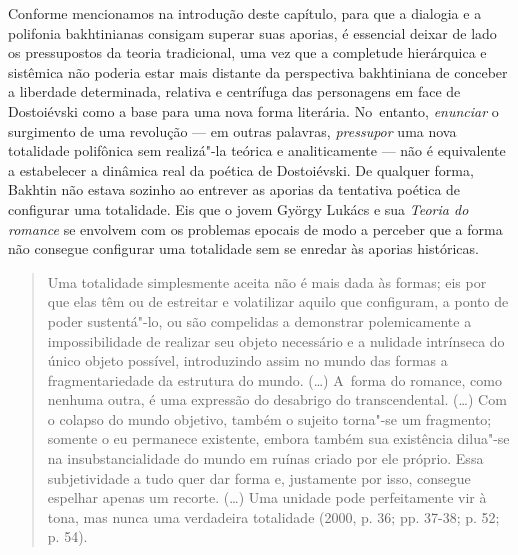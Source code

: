 Conforme mencionamos na introdução deste capítulo, para que a dialogia e
a polifonia bakhtinianas consigam superar suas aporias, é essencial
deixar de lado os pressupostos da teoria tradicional, uma vez que a
completude hierárquica e sistêmica não poderia estar mais distante da
perspectiva bakhtiniana de conceber a liberdade determinada, relativa e
centrífuga das personagens em face de Dostoiévski como a base para uma
nova forma literária. No~entanto, \emph{enunciar} o surgimento de uma
revolução --- em outras palavras, \emph{pressupor} uma nova totalidade
polifônica sem realizá"-la teórica e analiticamente --- não é equivalente
a estabelecer a dinâmica real da poética de Dostoiévski. De qualquer
forma, Bakhtin não estava sozinho ao entrever as aporias da tentativa
poética de configurar uma totalidade. Eis que o jovem György Lukács e
sua \emph{Teoria do romance} se envolvem com os problemas epocais de
modo a perceber que a forma não consegue configurar uma totalidade sem
se enredar às aporias históricas.

\begin{quote}
Uma totalidade simplesmente aceita não é mais dada às formas; eis por
que elas têm ou de estreitar e volatilizar aquilo que configuram, a
ponto de poder sustentá"-lo, ou são compelidas a demonstrar polemicamente
a impossibilidade de realizar seu objeto necessário e a nulidade
intrínseca do único objeto possível, introduzindo assim no mundo das
formas a fragmentariedade da estrutura do mundo. (\ldots) A~forma do
romance, como nenhuma outra, é uma expressão do desabrigo do
transcendental. (\ldots) Com o colapso do mundo objetivo, também o sujeito
torna"-se um fragmento; somente o eu permanece existente, embora também
sua existência dilua"-se na insubstancialidade do mundo em ruínas criado
por ele próprio. Essa subjetividade a tudo quer dar forma e, justamente
por isso, consegue espelhar apenas um recorte. (\ldots) Uma unidade pode
perfeitamente vir à tona, mas nunca uma verdadeira totalidade (2000, p.
36; pp. 37-38; p. 52; p. 54).
\end{quote}

